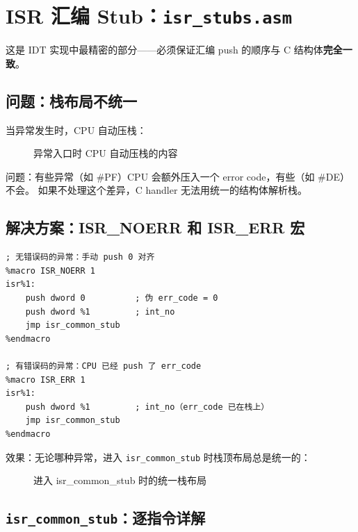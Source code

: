 \section{ISR 汇编 Stub：\texttt{isr\_stubs.asm}}

这是 IDT 实现中最精密的部分——必须保证汇编 push 的顺序与 C 结构体\textbf{完全一致}。

\subsection{问题：栈布局不统一}

当异常发生时，CPU 自动压栈：

\begin{figure}[H]
  \centering
  
  \caption{异常入口时 CPU 自动压栈的内容}
\end{figure}

问题：有些异常（如 \#PF）CPU 会额外压入一个 error code，有些（如 \#DE）不会。
如果不处理这个差异，C handler 无法用统一的结构体解析栈。

\subsection{解决方案：ISR\_NOERR 和 ISR\_ERR 宏}

\begin{lstlisting}[style=nasmstyle]
; 无错误码的异常：手动 push 0 对齐
%macro ISR_NOERR 1
isr%1:
    push dword 0          ; 伪 err_code = 0
    push dword %1         ; int_no
    jmp isr_common_stub
%endmacro

; 有错误码的异常：CPU 已经 push 了 err_code
%macro ISR_ERR 1
isr%1:
    push dword %1         ; int_no（err_code 已在栈上）
    jmp isr_common_stub
%endmacro
\end{lstlisting}

效果：无论哪种异常，进入 \texttt{isr\_common\_stub} 时栈顶布局总是统一的：

\begin{figure}[H]
  \centering
  
  \caption{进入 isr\_common\_stub 时的统一栈布局}
\end{figure}

\subsection{\texttt{isr\_common\_stub}：逐指令详解}

